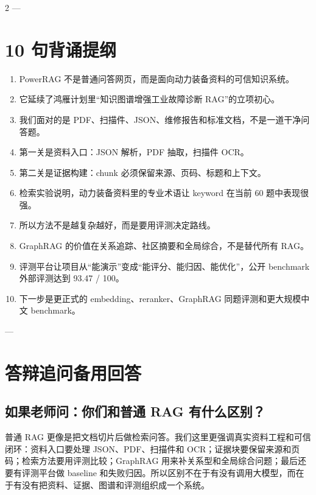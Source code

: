 \documentclass[10pt, a4paper]{ctexart}
\begin{document}
\begin{multicols}{2}
---

\section*{10 句背诵提纲}


\begin{enumerate}
\item PowerRAG 不是普通问答网页，而是面向动力装备资料的可信知识系统。
\item 它延续了鸿雁计划里“知识图谱增强工业故障诊断 RAG”的立项初心。
\item 我们面对的是 PDF、扫描件、JSON、维修报告和标准文档，不是一道干净问答题。
\item 第一关是资料入口：JSON 解析，PDF 抽取，扫描件 OCR。
\item 第二关是证据构建：chunk 必须保留来源、页码、标题和上下文。
\item 检索实验说明，动力装备资料里的专业术语让 keyword 在当前 60 题中表现很强。
\item 所以方法不是越复杂越好，而是要用评测决定路线。
\item GraphRAG 的价值在关系追踪、社区摘要和全局综合，不是替代所有 RAG。
\item 评测平台让项目从“能演示”变成“能评分、能归因、能优化”，公开 benchmark 外部评测达到 93.47 / 100。
\item 下一步是更正式的 embedding、reranker、GraphRAG 同题评测和更大规模中文 benchmark。
\end{enumerate}

---

\section*{答辩追问备用回答}


\subsection*{如果老师问：你们和普通 RAG 有什么区别？}


普通 RAG 更像是把文档切片后做检索问答。我们这里更强调真实资料工程和可信闭环：资料入口要处理 JSON、PDF、扫描件和 OCR；证据块要保留来源和页码；检索方法要用评测比较；GraphRAG 用来补关系型和全局综合问题；最后还要有评测平台做 baseline 和失败归因。所以区别不在于有没有调用大模型，而在于有没有把资料、证据、图谱和评测组织成一个系统。


\end{multicols}
\end{document}
